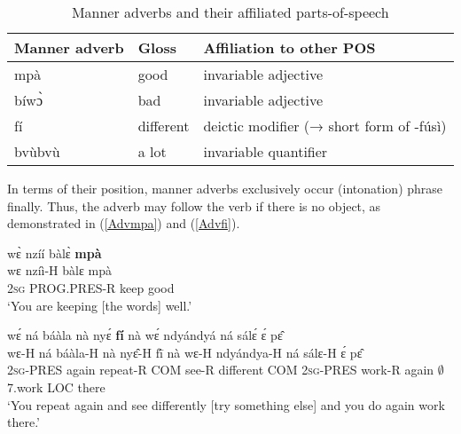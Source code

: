 \begin{table} 
\centering
\begin{tabular}{lll}
Manner adverb & Gloss & Affiliation to other POS \\  \midrule
mpà & 	good & invariable adjective \\
bíwɔ̀   & 	bad & invariable adjective \\
fí   & 	        different  & deictic modifier  (→ short form of -fúsì) \\
bvùbvù    &       a lot  & invariable quantifier \\ 
\end{tabular}
\caption{Manner adverbs and their affiliated parts-of-speech}
\label{Tab:ManAdv}
\end{table} 


In terms of their position, manner adverbs exclusively occur (intonation) phrase finally. Thus, the adverb may follow the verb if there is no object, as demonstrated in (\ref{Advmpa}) and (\ref{Advfi}).

\begin{exe} 
\ex\label{Advmpa}
  \glll     wɛ̀ nzíí bàlɛ̀ {\bfseries mpà} \\
	wɛ nzíì-H bàlɛ mpà \\
              2\textsc{sg} PROG.PRES-R keep good   \\
    \trans `You are keeping [the words] well.'
\end{exe}


\begin{exe} 
\ex\label{Advfi}
  \glll     wɛ́ ná báàla nà nyɛ́ {\bfseries fí} nà wɛ́ ndyándyá ná sálɛ́ ɛ́ pɛ̂  \\
	wɛ-H ná báàla-H nà nyɛ̂-H fī́ nà wɛ-H ndyándya-H ná sálɛ-H ɛ́ pɛ̂ \\
              2\textsc{sg}-PRES again repeat-R COM see-R different COM 2\textsc{sg}-PRES work-R again $\emptyset$7.work LOC there   \\
    \trans `You repeat again and see differently [try something else] and you do again work there.'
\end{exe}

